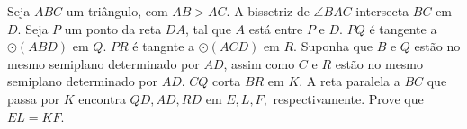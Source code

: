 Seja $ABC$ um triângulo, com $AB>AC$. A bissetriz de $\angle BAC$ intersecta $BC$ em $D$. Seja $P$ um ponto da reta $DA$, tal que $A$ está entre $P$ e $D$. $PQ$ é tangente a $\odot(ABD)$ em $Q$. $PR$ é tangnte a $\odot(ACD)$ em $R$. Suponha que $B$ e $Q$ estão no mesmo semiplano determinado por $AD$, assim como $C$ e $R$ estão no mesmo semiplano determinado por $AD$. $CQ$ corta $BR$ em $K$. A reta paralela a $BC$ que passa por $K$ encontra $QD,AD,RD$ em $E,L,F,$ respectivamente. Prove que $EL=KF$.
